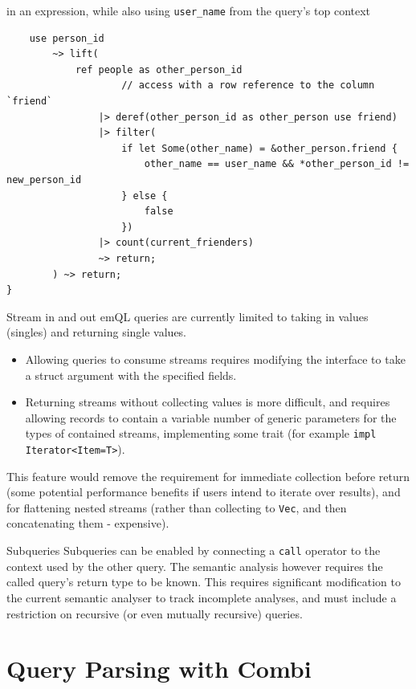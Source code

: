 in an expression, while also using \texttt{user_name} from the query's top context
\begin{verbatim}
    use person_id
        ~> lift(
            ref people as other_person_id
                    // access with a row reference to the column `friend`
                |> deref(other_person_id as other_person use friend)
                |> filter(
                    if let Some(other_name) = &other_person.friend { 
                        other_name == user_name && *other_person_id != new_person_id 
                    } else {
                        false 
                    })
                |> count(current_frienders)
                ~> return;
        ) ~> return;
}
\end{verbatim}

\begin{futurebox}{Stream in and out}
    emQL queries are currently limited to taking in values (singles) and returning single values.
    \begin{itemize}
        \setlength\itemsep{0em}
        \item Allowing queries to consume streams requires modifying the interface to take a struct argument with the specified fields.
        \item Returning streams without collecting values is more difficult, and requires allowing records to contain a variable number of generic parameters for the types of contained streams, implementing some trait (for example \texttt{impl Iterator<Item=T>}).
    \end{itemize}
    This feature would remove the requirement for immediate collection before return (some potential performance benefits if users intend to iterate over results), and for flattening nested streams (rather than collecting to \texttt{Vec}, and then concatenating them - expensive).
\end{futurebox}
\begin{futurebox}{Subqueries}
    Subqueries can be enabled by connecting a \texttt{call} operator to the context used by the other query. The semantic analysis however requires the called query's return type to be known.
    This requires significant modification to the current semantic analyser to track incomplete analyses, and must include a restriction on recursive (or even mutually recursive) queries.
\end{futurebox}
\section{Query Parsing with Combi}
